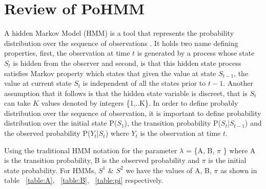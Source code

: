 \documentclass{sig-alternate}
\begin{document}
\section{Review of PoHMM}
\label{sec:review}

A hidden Markov Model (HMM) is a tool that represents the probability distribution over the sequence of observations \cite{Ghahramani}. It holds two name defining properties, first, the observation at time $t$ is generated by a process whose state $S_{t}$ is hidden from the observer and second, is that this hidden state process satisfies Markov property which states that given the value at state $S_{t-1}$, the value at current state $S_{t}$ is independent of all the states prior to $t-1$. Another assumption that it follows is that the hidden state variable is discreet, that is $S_{t}$ can take $K$ values denoted by integers \{1,..K\}. In order to define probably distribution  over the sequence of observation, it is important to define probability distribution over the initial state P($S_{1}$), the transition probability P($S_{t}$|$S_{t-1}$) and the observed probability P($Y_{t}$|$S_{t}$) where $Y_{t}$ is the observation at time $t$.

Using the traditional HMM notation for the parameter $\lambda$ = \{A, B, $\pi$ \} where A is the transition probability, B is the observed probability and $\pi$ is the initial state probability. For HMMs, $S^{1}$ \& $S^{2}$ we have the values of A, B, $\pi$ as shown in table ~\ref{table:A}, ~\ref{table:B}, ~\ref{table:pi} respectively.

\end{document}
